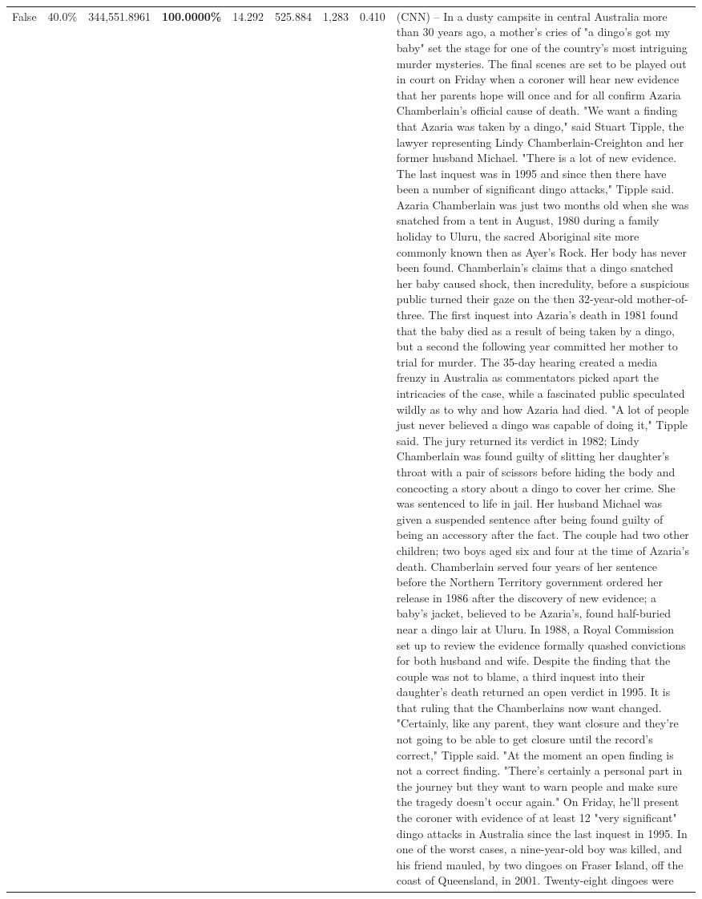 \begin{table}[H]
\begin{tabular}{lllrlllll}
False & 40.0\% & 344,551.8961 & \bfseries \color{red} 100.0000\% & 14.292 & 525.884 & 1,283 & 0.410 & (CNN) -- In a dusty campsite in central Australia more than 30 years ago, a mother's cries of "a dingo's got my baby" set the stage for one of the country's most intriguing murder mysteries. The final scenes are set to be played out in court on Friday when a coroner will hear new evidence that her parents hope will once and for all confirm Azaria Chamberlain's official cause of death. "We want a finding that Azaria was taken by a dingo," said Stuart Tipple, the lawyer representing Lindy Chamberlain-Creighton and her former husband Michael. "There is a lot of new evidence. The last inquest was in 1995 and since then there have been a number of significant dingo attacks," Tipple said. Azaria Chamberlain was just two months old when she was snatched from a tent in August, 1980 during a family holiday to Uluru, the sacred Aboriginal site more commonly known then as Ayer's Rock. Her body has never been found. Chamberlain's claims that a dingo snatched her baby caused shock, then incredulity, before a suspicious public turned their gaze on the then 32-year-old mother-of-three. The first inquest into Azaria's death in 1981 found that the baby died as a result of being taken by a dingo, but a second the following year committed her mother to trial for murder. The 35-day hearing created a media frenzy in Australia as commentators picked apart the intricacies of the case, while a fascinated public speculated wildly as to why and how Azaria had died. "A lot of people just never believed a dingo was capable of doing it," Tipple said. The jury returned its verdict in 1982; Lindy Chamberlain was found guilty of slitting her daughter's throat with a pair of scissors before hiding the body and concocting a story about a dingo to cover her crime. She was sentenced to life in jail. Her husband Michael was given a suspended sentence after being found guilty of being an accessory after the fact. The couple had two other children; two boys aged six and four at the time of Azaria's death. Chamberlain served four years of her sentence before the Northern Territory government ordered her release in 1986 after the discovery of new evidence; a baby's jacket, believed to be Azaria's, found half-buried near a dingo lair at Uluru. In 1988, a Royal Commission set up to review the evidence formally quashed convictions for both husband and wife. Despite the finding that the couple was not to blame, a third inquest into their daughter's death returned an open verdict in 1995. It is that ruling that the Chamberlains now want changed. "Certainly, like any parent, they want closure and they're not going to be able to get closure until the record's correct," Tipple said. "At the moment an open finding is not a correct finding. "There's certainly a personal part in the journey but they want to warn people and make sure the tragedy doesn't occur again." On Friday, he'll present the coroner with evidence of at least 12 "very significant" dingo attacks in Australia since the last inquest in 1995. In one of the worst cases, a nine-year-old boy was killed, and his friend mauled, by two dingoes on Fraser Island, off the coast of Queensland, in 2001. Twenty-eight dingoes were 
\end{tabular}
\end{table}
